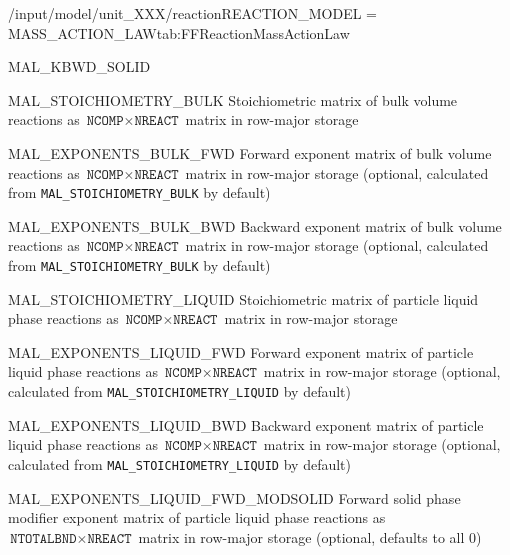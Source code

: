 \begin{condsubgroup}{/input/model/unit\_XXX/reaction}{REACTION\_MODEL = MASS\_ACTION\_LAW}{tab:FFReactionMassActionLaw}
\begin{dataset}[type=double,range={$\geq 0$},length={\texttt{NREACT}}]{MAL\_KBWD\_SOLID}
  \end{dataset}
  \begin{dataset}[type=double,length={$\texttt{NCOMP} \cdot \texttt{NREACT}$}]{MAL\_STOICHIOMETRY\_BULK}
    Stoichiometric matrix of bulk volume reactions as $\texttt{NCOMP} \times \texttt{NREACT}$ matrix in row-major storage
  \end{dataset}
  \begin{dataset}[type=double,length={$\texttt{NCOMP} \cdot \texttt{NREACT}$}]{MAL\_EXPONENTS\_BULK\_FWD}
    Forward exponent matrix of bulk volume reactions as $\texttt{NCOMP} \times \texttt{NREACT}$ matrix in row-major storage (optional, calculated from \texttt{MAL\_STOICHIOMETRY\_BULK} by default)
  \end{dataset}
  \begin{dataset}[type=double,length={$\texttt{NCOMP} \cdot \texttt{NREACT}$}]{MAL\_EXPONENTS\_BULK\_BWD}
    Backward exponent matrix of bulk volume reactions as $\texttt{NCOMP} \times \texttt{NREACT}$ matrix in row-major storage (optional, calculated from \texttt{MAL\_STOICHIOMETRY\_BULK} by default)
  \end{dataset}
  \begin{dataset}[type=double,length={$\texttt{NCOMP} \cdot \texttt{NREACT}$}]{MAL\_STOICHIOMETRY\_LIQUID}
    Stoichiometric matrix of particle liquid phase reactions as $\texttt{NCOMP} \times \texttt{NREACT}$ matrix in row-major storage
  \end{dataset}
  \begin{dataset}[type=double,length={$\texttt{NCOMP} \cdot \texttt{NREACT}$}]{MAL\_EXPONENTS\_LIQUID\_FWD}
    Forward exponent matrix of particle liquid phase reactions as $\texttt{NCOMP} \times \texttt{NREACT}$ matrix in row-major storage (optional, calculated from \texttt{MAL\_STOICHIOMETRY\_LIQUID} by default)
  \end{dataset}
  \begin{dataset}[type=double,length={$\texttt{NCOMP} \cdot \texttt{NREACT}$}]{MAL\_EXPONENTS\_LIQUID\_BWD}
    Backward exponent matrix of particle liquid phase reactions as $\texttt{NCOMP} \times \texttt{NREACT}$ matrix in row-major storage (optional, calculated from \texttt{MAL\_STOICHIOMETRY\_LIQUID} by default)
  \end{dataset}
  \begin{dataset}[type=double,length={$\texttt{NTOTALBND} \cdot \texttt{NREACT}$}]{MAL\_EXPONENTS\_LIQUID\_FWD\_MODSOLID}
    Forward solid phase modifier exponent matrix of particle liquid phase reactions as $\texttt{NTOTALBND} \times \texttt{NREACT}$ matrix in row-major storage (optional, defaults to all $0$)

\end{dataset}
\end{condsubgroup}
